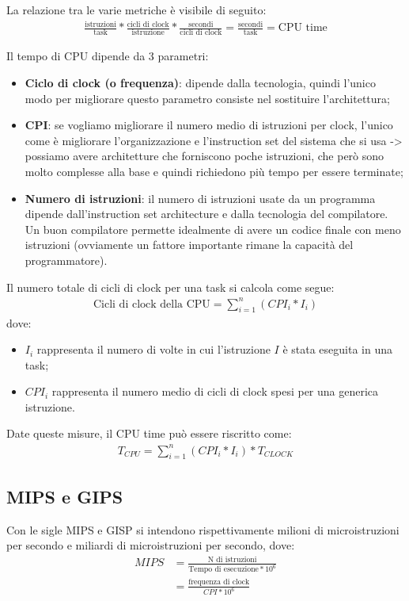 La relazione tra le varie metriche è visibile di seguito:
\begin{align*}
    \frac{\text{istruzioni}}{\text{task}} * \frac{\text{cicli di clock}}{\text{istruzione}} * \frac{\text{secondi}}{\text{cicli di clock}}= \frac{\text{secondi}}{\text{task}} = \text{CPU time}
\end{align*}

Il tempo di CPU dipende da 3 parametri:
\begin{itemize}
    \item \textbf{Ciclo di clock (o frequenza)}: dipende dalla tecnologia, quindi l'unico modo per migliorare questo parametro consiste nel sostituire l'architettura;
    \item \textbf{CPI}: se vogliamo migliorare il numero medio di istruzioni per clock, l'unico come è migliorare l'organizzazione e l'instruction set del sistema che si usa -> possiamo avere architetture che forniscono poche istruzioni, che però sono molto complesse alla base e quindi richiedono più tempo per essere terminate;
    \item \textbf{Numero di istruzioni}: il numero di istruzioni usate da un programma dipende dall'instruction set architecture e dalla tecnologia del compilatore. Un buon compilatore permette idealmente di avere un codice finale con meno istruzioni (ovviamente un fattore importante rimane la capacità del programmatore).
\end{itemize}

Il numero totale di cicli di clock per una task si calcola come segue:
\begin{align*}
    \text{Cicli di clock della CPU} = \sum^n_{i=1} (CPI_i * I_i)
\end{align*}
dove:
\begin{itemize}
    \item $I_i$ rappresenta il numero di volte in cui l'istruzione $I$ è stata eseguita in una task;
    \item $CPI_i$ rappresenta il numero medio di cicli di clock spesi per una generica istruzione.
\end{itemize}

Date queste misure, il CPU time può essere riscritto come:
\begin{align*}
    T_{CPU} = \sum^n_{i = 1} (CPI_i * I_i) * T_{CLOCK}
\end{align*}


\subsection{MIPS e GIPS}
Con le sigle MIPS e GISP si intendono rispettivamente milioni di microistruzioni per secondo e miliardi di microistruzioni per secondo, dove:
\begin{align*}
    MIPS &= \frac{\text{N di istruzioni}}{\text{Tempo di esecuzione} * 10^6}\\
    &= \frac{\text{frequenza di clock}}{CPI * 10^6}
\end{align*}

